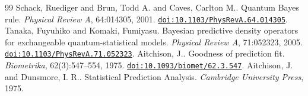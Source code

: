 \documentclass[journal]{IEEEtran}
\begin{document}
\begin{thebibliography}{99}
Schack, Ruediger and Brun, Todd A. and Caves, Carlton M..
\newblock Quantum Bayes rule.
\newblock \emph{Physical Review A}, 64:014305, 2001.  
\newblock \href{https://doi.org/10.1103/PhysRevA.64.014305}{\texttt{doi:10.1103/PhysRevA.64.014305}}.  
Tanaka, Fuyuhiko and Komaki, Fumiyasu.
\newblock Bayesian predictive density operators for exchangeable quantum-statistical models.
\newblock \emph{Physical Review A}, 71:052323, 2005.  
\newblock \href{https://doi.org/10.1103/PhysRevA.71.052323}{\texttt{doi:10.1103/PhysRevA.71.052323}}.  
Aitchison, J..
\newblock Goodness of prediction fit.
\newblock \emph{Biometrika}, 62(3):547--554, 1975.  
\newblock \href{https://doi.org/10.1093/biomet/62.3.547}{\texttt{doi:10.1093/biomet/62.3.547}}.  
Aitchison, J. and Dunsmore, I. R..
\newblock Statistical Prediction Analysis.
\newblock \emph{Cambridge University Press}, 1975.


\end{thebibliography}
\end{document}
